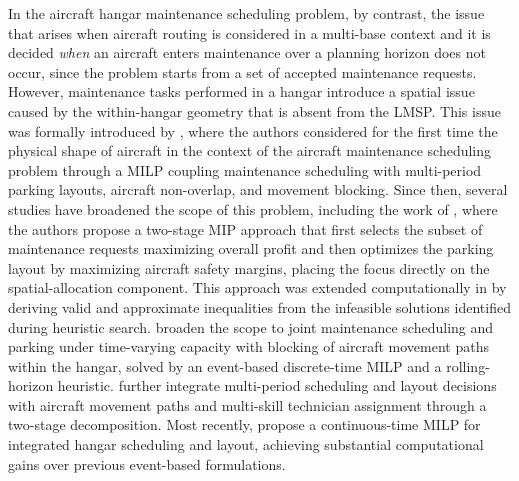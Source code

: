 In the aircraft hangar maintenance scheduling problem, by contrast, the issue that arises when aircraft routing is considered in a multi-base context and it is decided \emph{when} an aircraft enters maintenance over a planning horizon does not occur, since the problem starts from a set of accepted maintenance requests. However, maintenance tasks performed in a hangar introduce a spatial issue caused by the within-hangar geometry that is absent from the LMSP. This issue was formally introduced by \citet{Qin2017}, where the authors considered for the first time the physical shape of aircraft in the context of the aircraft maintenance scheduling problem through a MILP coupling maintenance scheduling with multi-period parking layouts, aircraft non-overlap, and movement blocking. Since then, several studies have broadened the scope of this problem, including the work of \citet{Qin2018}, where the authors propose a two-stage MIP approach that first selects the subset of maintenance requests maximizing overall profit and then optimizes the parking layout by maximizing aircraft safety margins, placing the focus directly on the spatial-allocation component. This approach was extended computationally in \citet{Qin2018b} by deriving valid and approximate inequalities from the infeasible solutions identified during heuristic search. \citet{Qin2019} broaden the scope to joint maintenance scheduling and parking under time-varying capacity with blocking of aircraft movement paths within the hangar, solved by an event-based discrete-time MILP and a rolling-horizon heuristic. \citet{Qin2020} further integrate multi-period scheduling and layout decisions with aircraft movement paths and multi-skill technician assignment through a two-stage decomposition. Most recently, \citet{Pazhooh2025} propose a continuous-time MILP for integrated hangar scheduling and layout, achieving substantial computational gains over previous event-based formulations.

